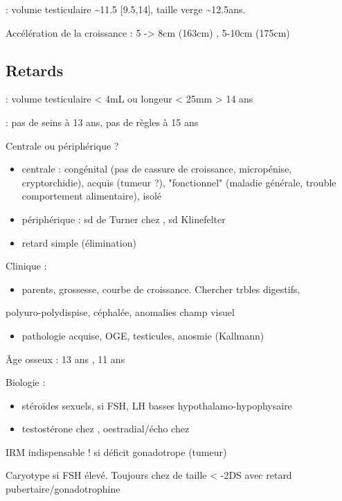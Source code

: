 \documentclass[11pt]{article}
\begin{document}
\male : \inc volume testiculaire \textasciitilde{}11.5 [9.5,14], \inc taille verge \textasciitilde{}12.5ans.

Accélération de la croissance : 5 -> 8cm (163cm) \female, 5-10cm (175cm)
\subsection{Retards}
\label{sec:org191ff56}
\male :  volume testiculaire < 4mL ou longeur < 25mm > 14 ans 

\female : pas de seins à 13 ans, pas de règles à 15 ans

Centrale ou périphérique ?
\begin{itemize}
\item centrale : congénital (pas de cassure de croissance, micropénise,
cryptorchidie), acquis (tumeur ?), "fonctionnel" (maladie générale, trouble
comportement alimentaire), isolé
\item périphérique : sd de Turner chez \female, sd Klinefelter \male
\item retard simple (élimination)
\end{itemize}

Clinique : 
\begin{itemize}
\item parents, grossesse, courbe de croissance. Chercher trbles digestifs,
\end{itemize}
polyuro-polydispise, céphalée, anomalies champ visuel
\begin{itemize}
\item pathologie acquise, OGE, testicules, anosmie (Kallmann)
\end{itemize}

Âge osseux : 13 ans \male, 11 ans \female

Biologie : 
\begin{itemize}
\item stéroïdes sexuels, si FSH, LH basses \thus hypothalamo-hypophysaire
\item testostérone chez \male, oestradial/écho chez \female
\end{itemize}

IRM indispensable ! si déficit gonadotrope (tumeur)

Caryotype si FSH élevé. Toujours chez \female de taille < -2DS avec retard
pubertaire/gonadotrophine \inc
\end{document}
